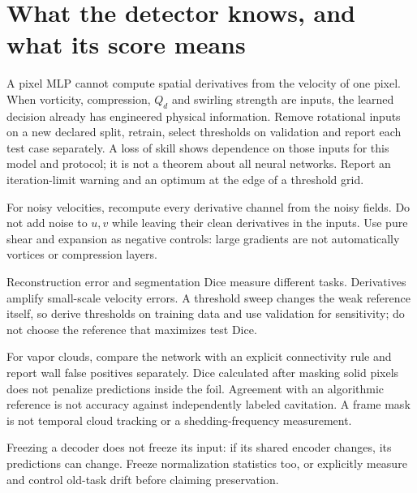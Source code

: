 \section*{What the detector knows, and what its score means}
A pixel MLP cannot compute spatial derivatives from the velocity of one pixel.
When vorticity, compression, $Q_d$ and swirling strength are inputs, the learned
decision already has engineered physical information. Remove rotational inputs
on a new declared split, retrain, select thresholds on validation and report each
test case separately. A loss of skill shows dependence on those inputs for this
model and protocol; it is not a theorem about all neural networks. Report an
iteration-limit warning and an optimum at the edge of a threshold grid.

For noisy velocities, recompute every derivative channel from the noisy fields.
Do not add noise to $u,v$ while leaving their clean derivatives in the inputs.
Use pure shear and expansion as negative controls: large gradients are not
automatically vortices or compression layers.

Reconstruction error and segmentation Dice measure different tasks. Derivatives
amplify small-scale velocity errors. A threshold sweep changes the weak reference
itself, so derive thresholds on training data and use validation for sensitivity;
do not choose the reference that maximizes test Dice.

For vapor clouds, compare the network with an explicit connectivity rule and
report wall false positives separately. Dice calculated after masking solid
pixels does not penalize predictions inside the foil. Agreement with an
algorithmic reference is not accuracy against independently labeled cavitation.
A frame mask is not temporal cloud tracking or a shedding-frequency measurement.

Freezing a decoder does not freeze its input: if its shared encoder changes,
its predictions can change. Freeze normalization statistics too, or explicitly
measure and control old-task drift before claiming preservation.
